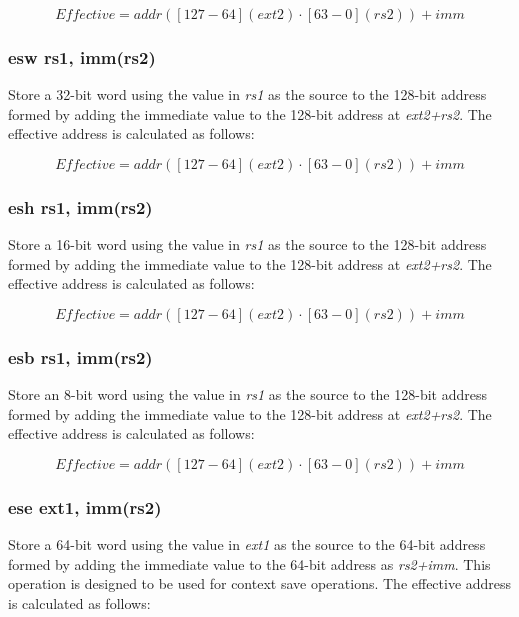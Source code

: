 \documentclass{article}
\begin{document}
\begin{equation}
Effective = addr([127-64](ext2) \cdot [63-0](rs2))+imm
\end{equation}

\subsubsection{esw rs1, imm(rs2)}
Store a 32-bit word using the value in \textit{rs1} as the source 
to the 128-bit address formed by adding the immediate value to the 
128-bit address at \textit{ext2+rs2}.  The effective address is calculated 
as follows: 

\begin{equation}
Effective = addr([127-64](ext2) \cdot [63-0](rs2))+imm
\end{equation}

\subsubsection{esh rs1, imm(rs2)}
Store a 16-bit word using the value in \textit{rs1} as the source 
to the 128-bit address formed by adding the immediate value to the 
128-bit address at \textit{ext2+rs2}.  The effective address is calculated 
as follows: 

\begin{equation}
Effective = addr([127-64](ext2) \cdot [63-0](rs2))+imm
\end{equation}

\subsubsection{esb rs1, imm(rs2)}
Store an 8-bit word using the value in \textit{rs1} as the source 
to the 128-bit address formed by adding the immediate value to the 
128-bit address at \textit{ext2+rs2}.  The effective address is calculated 
as follows: 

\begin{equation}
Effective = addr([127-64](ext2) \cdot [63-0](rs2))+imm
\end{equation}

\subsubsection{ese ext1, imm(rs2)}
Store a 64-bit word using the value in \textit{ext1} as the source to the 
64-bit address formed by adding the immediate value to the 64-bit 
address as \textit{rs2+imm}.  This operation is designed to be used for 
context save operations.  The effective address is calculated as follows: 
\end{document}
